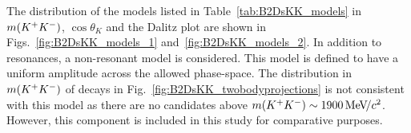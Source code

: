The distribution of the models listed in Table~\ref{tab:B2DsKK_models} in $m({{K}^+}{{K}^-})$, $\cos\theta_{K}$ and the \decay{\Bp}{\Dsp\Kp\Km} Dalitz plot are shown in Figs.~\ref{fig:B2DsKK_models_1} and~\ref{fig:B2DsKK_models_2}. 
In addition to \Kp\Km resonances, a non-resonant model is considered. This model is defined to have a uniform amplitude across the allowed phase-space. The distribution in $m({{K}^+}{{K}^-})$ of \decay{\Bp}{\Dsp\Kp\Km} decays in Fig.~\ref{fig:B2DsKK_twobodyprojections} is not consistent with this model as there are no candidates above $m({{K}^+}{{K}^-}) \sim 1900{\mathrm{\,Me\kern -0.1em V\!/}c^2}$. However, this component is included in this study for comparative purposes. 



